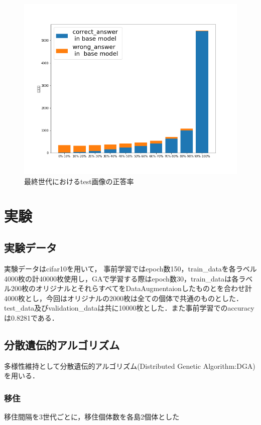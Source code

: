 \documentclass[twocolumn]{jarticle}     %
\begin{document}
\begin{figure}[h]
	\centering
	\includegraphics[scale=0.3]{graph_test_before.png}
	\caption{最終世代におけるtest画像の正答率\label{fig:accLastTest}}
\end{figure}


\section{実験}

\subsection{実験データ}
実験データはcifar10を用いて，
事前学習ではepoch数150，train\_dataを各ラベル4000枚の計40000枚使用し，GAで学習する際はepoch数30，train\_dataは各ラベル200枚のオリジナルとそれらすべてをDataAugmentaionしたものとを合わせ計4000枚とし，今回はオリジナルの2000枚は全ての個体で共通のものとした．test\_data及びvalidation\_dataは共に10000枚とした．また事前学習でのaccuracyは0.8281である．
\subsection{分散遺伝的アルゴリズム}
多様性維持として分散遺伝的アルゴリズム(Distributed Genetic Algorithm:DGA)\cite{廣安知之2002実験計画法を用いた分散遺伝的アルゴリズムのパラメータ推定}を用いる．


\subsubsection{移住}
移住間隔を3世代ごとに，移住個体数を各島2個体とした
\end{document}
